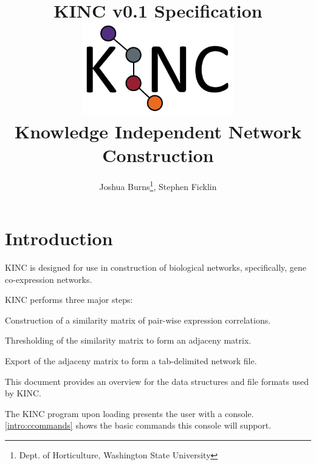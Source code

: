 \documentclass[10pt]{article}
\begin{document}
\title{\textbf{KINC v0.1 Specification}\\
\vspace{1mm}
\includegraphics[width=8cm,height=4cm]{KINClogo.png}
\\Knowledge Independent Network Construction}
\author{Joshua Burns\thanks{Dept. of Horticulture, Washington State 
University}, Stephen Ficklin\footnotemark[1]}
\maketitle

\newpage
\tableofcontents

\newpage
\section{Introduction}

KINC is designed for use in construction of biological networks, specifically, 
gene co-expression networks.

KINC performs three major steps:

\begin{list}{}{}
\item[1)] Construction of a similarity matrix of pair-wise expression 
correlations.
\item[2)] Thresholding of the similarity matrix to form an adjaceny matrix.
\item[3)] Export of the adjaceny matrix to form a tab-delimited network file.
\end{list}

This document provides an overview for the data structures and file formats 
used by KINC.

The KINC program upon loading presents the user with a console. 
\autoref{intro:ccommands} shows the basic commands this console will support.
\end{document}
